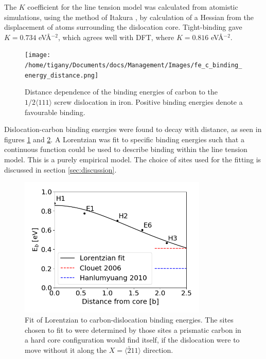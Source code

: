\documentclass[a4paper,11pt]{article}
\begin{document}
The \(K\) coefficient for the line tension model was calculated from atomistic simulations, using
the method of Itakura \cite{Itakura2012}, by calculation of a Hessian from the displacement of
atoms surrounding the dislocation core. Tight-binding gave \(K = 0.734\) eV\AA{}\(^{-2}\), which agrees well
with DFT, where \(K = 0.816\) eV\AA{}\(^{-2}\).


\begin{figure}[htbp]

\texttt{[image: /home/tigany/Documents/docs/Management/Images/fe\_c\_binding\_energy\_distance.png]}
\caption{Distance dependence of the binding energies of carbon to the \(1/2\langle 111 \rangle\) screw dislocation in iron. Positive binding energies denote a favourable binding. \label{distancedep}}
\end{figure}

Dislocation-carbon binding energies were found to decay with distance, as seen in figures
\ref{distancedep} and \ref{lorentzianfit}. A Lorentzian was fit to specific binding energies such
that a continuous function could be used to describe binding within
the line tension model. This is a purely empirical model. The
choice of sites used for the fitting is discussed in section \ref{sec:discussion}.




\begin{figure}[htbp]

\includegraphics[width=0.8\textwidth]{Images/fe-c_lorentzian_fit_binding_energies_quadrupole.png}
\caption{Fit of Lorentzian to carbon-dislocation binding energies. The sites chosen to fit to were determined by those sites a prismatic carbon in a hard core configuration would find itself, if the dislocation were to move without it along the \(X = \langle\bar{2}11\rangle\) direction. \label{lorentzianfit}}
\end{figure}
\end{document}
